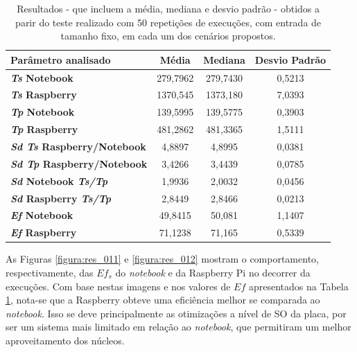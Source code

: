 \begin{table}[htb] \centering
	\caption{Resultados - que incluem a média, mediana e desvio padrão - obtidos a parir do teste realizado com 50 repetições de execuções, com entrada de tamanho fixo, em cada um dos cenários propostos.} \label{tabela:mostragem50}
	\begin{tabular}{l|ccc}        \hline
		\textbf{Parâmetro analisado} & \textbf{Média} & \textbf{Mediana} & \textbf{Desvio Padrão} \\ \hline \hline
		\textbf{\textit{Ts} Notebook}			& 279,7962		  & 279,7430		 & 0,5213	\\
		\textbf{\textit{Ts} Raspberry}			& 1370,545		  & 1373,180		 & 7,0393	\\
		\textbf{\textit{Tp} Notebook}			& 139,5995		  & 139,5775		 & 0,3903	\\
		\textbf{\textit{Tp} Raspberry}			& 481,2862		  & 481,3365		 & 1,5111	\\
		\textbf{\textit{Sd Ts} Raspberry/Notebook} & 4,8897		  & 4,8995			 & 0,0381	\\
		\textbf{\textit{Sd Tp} Raspberry/Notebook} & 3,4266		  & 3,4439			 & 0,0785	\\
		\textbf{\textit{Sd} Notebook \textit{Ts/Tp}}		& 1,9936		  & 2,0032			 & 0,0456	\\
		\textbf{\textit{Sd} Raspberry \textit{Ts/Tp}}		& 2,8449		  & 2,8466			 & 0,0213	\\
		\textbf{\textit{Ef} Notebook}			& 49,8415		  & 50,081			 & 1,1407	\\
		\textbf{\textit{Ef} Raspberry}			& 71,1238		  & 71,165			 & 0,5339	\\ \hline
	\end{tabular}
\end{table}

As Figuras \ref{figura:res_011} e \ref{figura:res_012} mostram o comportamento, respectivamente, das $Ef_s$ do \textit{notebook} e da Raspberry Pi no decorrer da execuções. Com base nestas imagens e nos valores de $Ef$ apresentados na Tabela \ref{tabela:mostragem50}, nota-se que a Raspberry obteve uma eficiência melhor se comparada ao \textit{notebook}. Isso se deve principalmente as otimizações a nível de SO da placa, por ser um sistema mais limitado em relação ao \textit{notebook}, que permitiram um melhor aproveitamento dos núcleos.

